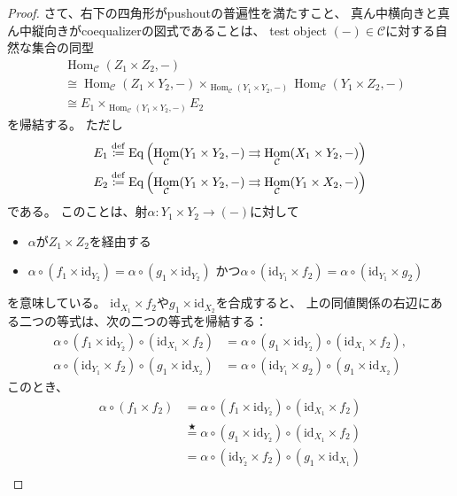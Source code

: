 \documentclass[uplatex]{jsarticle}
\theoremstyle{definition}
\def\id{\mathrm{id}}
\DeclareMathOperator{\Hom}{Hom}
\def\mcC{\mathcal{C}}
\newcommand{\dfn}{\overset{\mathrm{\tiny def}}{\coloneqq}}
\begin{document}
\begin{proof}
  さて、右下の四角形がpushoutの普遍性を満たすこと、
  真ん中横向きと真ん中縦向きがcoequalizerの図式であることは、
  test object \((-)\in \mcC\)に対する自然な集合の同型
  \begin{align*}
    &\Hom_{\mcC}(Z_1\times Z_2,-) \\
    &\cong \Hom_{\mcC}(Z_1\times Y_2,-)\times_{\Hom_{\mcC}(Y_1\times Y_2,-)}
    \Hom_{\mcC}(Y_1\times Z_2,-) \\
    &\cong E_1 \times_{\Hom_{\mcC}(Y_1\times Y_2,-)} E_2
  \end{align*}
  を帰結する。
  ただし
  \begin{align*}
    E_1 &\dfn
    \mathrm{Eq}\left( \Hom_{\mcC}(Y_1\times Y_2,-) \rightrightarrows \Hom_{\mcC}(X_1\times Y_2,-)\right) \\
    E_2 &\dfn
    \mathrm{Eq}\left( \Hom_{\mcC}(Y_1\times Y_2,-) \rightrightarrows \Hom_{\mcC}(Y_1\times X_2,-)\right)
  \end{align*}
  である。
  このことは、射\(\alpha:Y_1\times Y_2\to (-)\)に対して
  \begin{itemize}
    \item[ \ ]
    \(\alpha\)が\(Z_1\times Z_2\)を経由する
    \item[\(\Leftrightarrow\)]
    \(\alpha\circ (f_1\times \id_{Y_2}) = \alpha\circ (g_1\times \id_{Y_2})\)
    かつ\(\alpha\circ (\id_{Y_1}\times f_2) = \alpha\circ (\id_{Y_1}\times g_2)\)
  \end{itemize}
  を意味している。
  \(\id_{X_1}\times f_2\)や\(g_1\times \id_{X_2}\)を合成すると、
  上の同値関係の右辺にある二つの等式は、次の二つの等式を帰結する：
  \begin{equation}
    \label{eq: prob: 0.1}
    \begin{aligned}
      \alpha\circ (f_1\times \id_{Y_2})\circ (\id_{X_1}\times f_2)
      &= \alpha\circ (g_1\times \id_{Y_2})\circ (\id_{X_1}\times f_2), \\
      \alpha\circ (\id_{Y_1}\times f_2)\circ (g_1\times \id_{X_2})
      &= \alpha\circ (\id_{Y_1}\times g_2)\circ (g_1\times \id_{X_2})
    \end{aligned}
    \tag{\(\bigstar\)}
  \end{equation}
  このとき、
  \begin{align*}
    \alpha \circ (f_1\times f_2)
    &= \alpha \circ (f_1\times \id_{Y_2})\circ (\id_{X_1}\times f_2) \\
    &\overset{\bigstar}{=} \alpha \circ (g_1\times \id_{Y_2})\circ (\id_{X_1}\times f_2) \\
    &= \alpha \circ (\id_{Y_2}\times f_2)\circ (g_1\times \id_{X_1}) \\

\end{align*}
\end{proof}
\end{document}
